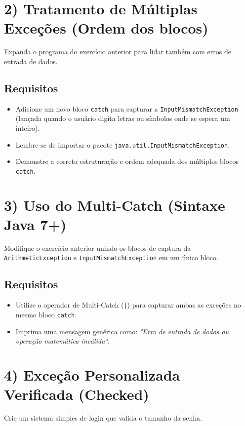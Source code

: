 \documentclass[12pt]{article}
\begin{document}
\section*{2) Tratamento de Múltiplas Exceções (Ordem dos blocos)}
Expanda o programa do exercício anterior para lidar também com erros de entrada de dados.

\subsection*{Requisitos}
\begin{itemize}
    \item Adicione um novo bloco \texttt{catch} para capturar a \texttt{InputMismatchException} (lançada quando o usuário digita letras ou símbolos onde se espera um inteiro).
    \item Lembre-se de importar o pacote \texttt{java.util.InputMismatchException}.
    \item Demonstre a correta estruturação e ordem adequada dos múltiplos blocos \texttt{catch}.
\end{itemize}

\section*{3) Uso do Multi-Catch (Sintaxe Java 7+)}
Modifique o exercício anterior unindo os blocos de captura da \texttt{ArithmeticException} e \texttt{InputMismatchException} em um único bloco.

\subsection*{Requisitos}
\begin{itemize}
    \item Utilize o operador de Multi-Catch (\texttt{|}) para capturar ambas as exceções no mesmo bloco \texttt{catch}.
    \item Imprima uma mensagem genérica como: \textit{"Erro de entrada de dados ou operação matemática inválida"}.
\end{itemize}

\section*{4) Exceção Personalizada Verificada (Checked)}
Crie um sistema simples de login que valida o tamanho da senha.
\end{document}
